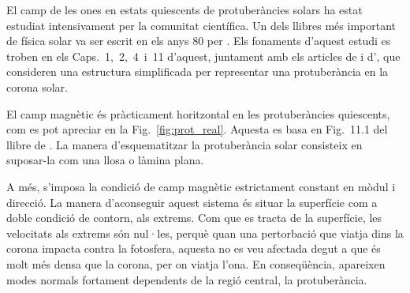 El camp de les ones en estats quiescents de protuberàncies solars ha estat estudiat intensivament per la comunitat científica.
Un dels llibres més important de física solar va ser escrit en els anys 80 per \textcite{Priest_2014}.
Els fonaments d'aquest estudi es troben en els Caps.~1,~2,~4~i~11 d'aquest,
juntament amb els articles de \textcite{oscillation_modes_II} i d'\textcite{oscillations_quiescent_solar_prominence},
que consideren una estructura simplificada per representar una protuberància en la corona solar.





El camp magnètic és pràcticament horitzontal en les protuberàncies quiescents, com es pot apreciar en la Fig.~\ref{fig:prot_real}.
Aquesta es basa en Fig.~11.1 del llibre de \textcite{Priest_2014}.
La manera d'esquematitzar la protuberància solar consisteix en suposar-la com una llosa o làmina plana.

A més, s'imposa la condició de camp magnètic estrictament constant en mòdul i direcció.
La manera d'aconseguir aquest sistema és situar la superfície com a doble condició de contorn, als extrems.
Com que es tracta de la superfície, les velocitats als extrems són nul·les, perquè quan una pertorbació que viatja dins la corona impacta contra la fotosfera,
aquesta no es veu afectada degut a que és molt més densa que la corona, per on viatja l'ona.
En conseqüència, apareixen modes normals fortament dependents de la regió central, la protuberància.

